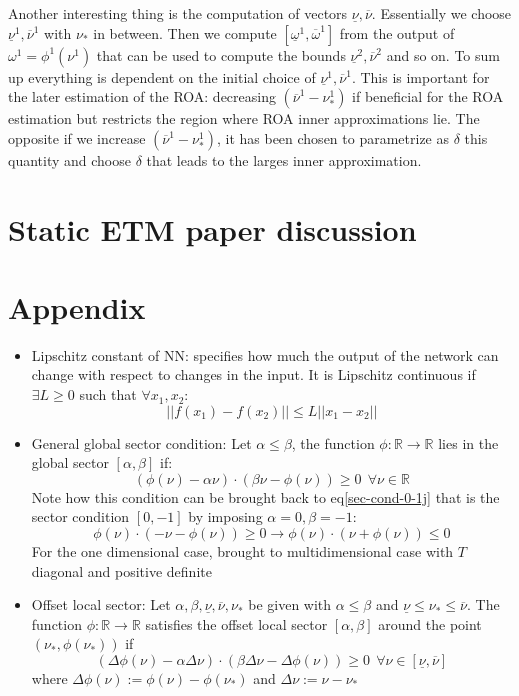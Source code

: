 \documentclass[12pt]{article}
\begin{document}
Another interesting thing is the computation of vectors $\underline{\nu}, \overline{\nu}$. Essentially we choose $\underline{\nu}^1, \overline{\nu}^1$ with $\nu_*$ in between. Then we compute $[\underline{\omega}^1, \overline{\omega}^1]$ from the output of $\omega^1 = \phi^1(\nu^1)$ that can be used to compute the bounds $\underline{\nu}^2, \overline{\nu}^2$ and so on. To sum up everything is dependent on the initial choice of $\underline{\nu}^1, \overline{\nu}^1$. This is important for the later estimation of the ROA: decreasing $(\overline{\nu}^1 - \nu_*^1)$ if beneficial for the ROA estimation but restricts the region where ROA inner approximations lie. The opposite if we increase $\left( \overline{\nu}^1 - \nu_*^1 \right)$, it has been chosen to parametrize as $\delta$ this quantity and choose $\delta$ that leads to the larges inner approximation.

\section*{Static ETM paper discussion}

\section*{Appendix}
\begin{itemize}
  \item Lipschitz constant of NN: specifies how much the output of the network can change with respect to changes in the input. It is Lipschitz continuous if $\exists L \geq 0$ such that $\forall x_1, x_2$:
  $$
    || f(x_1) - f(x_2)|| \leq L || x_1 - x_2||
  $$
  \item General global sector condition: Let $\alpha \leq \beta$, the function $\phi : \mathbb{R} \to \mathbb{R}$ lies in the global sector $[\alpha, \beta]$ if:
  $$
    (\phi(\nu) - \alpha \nu) \cdot (\beta \nu - \phi(\nu)) \geq 0\ \ \forall \nu \in \mathbb{R}
  $$
  Note how this condition can be brought back to  eq\ref{sec-cond-0-1j} that is the sector condition $[0, -1]$ by imposing $\alpha = 0, \beta = -1$:
  $$
    \phi(\nu) \cdot (-\nu - \phi(\nu)) \geq 0 \to \phi(\nu) \cdot (\nu + \phi(\nu)) \leq 0
  $$
  For the one dimensional case, brought to multidimensional case with $T$ diagonal and positive definite
  \item Offset local sector: Let $\alpha, \beta, \underline{\nu}, \overline{\nu}, \nu_*$ be given with $\alpha \leq \beta$ and $\underline{\nu} \leq \nu_* \leq \overline{\nu}$. The function $\phi : \mathbb{R} \to \mathbb{R}$ satisfies the offset local sector $[\alpha, \beta]$ around the point $\left( \nu_*, \phi(\nu_*) \right)$ if 
  $$
    \left( \Delta \phi(\nu) - \alpha \Delta \nu \right) \cdot \left( \beta \Delta \nu - \Delta \phi(\nu) \right) \geq 0\ \ \forall \nu \in [\underline{\nu}, \overline{\nu}]
  $$
  where $\Delta \phi(\nu) := \phi(\nu) - \phi(\nu_*)$ and $\Delta \nu := \nu - \nu_*$
\end{itemize}
\end{document}
